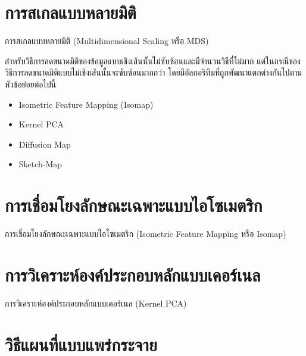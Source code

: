 \section{การสเกลแบบหลายมิติ}
\label{sec:mds}

การสเกลแบบหลายมิติ (Multidimensional Scaling หรือ MDS)\autocite{young1938,torgerson1952}

สำหรับวิธีการลดขนาดมิติของข้อมูลแบบเชิงเส้นนั้นไม่ซับซ้อนและมีจำนวนวิธีที่ไม่มาก แต่ในกรณีของวิธีการลดขนาดมิติแบบไม่เชิงเส้นนั้นจะซับซ้อนมากกว่า
โดยมีอัลกอริทึมที่ถูกพัฒนาแตกต่างกันไปตามหัวข้อย่อยต่อไปนี้\autocite{glielmo2021}

\begin{itemize}
    \item Isometric Feature Mapping (Isomap)
    
    \item Kernel PCA
    
    \item Diffusion Map
    
    \item Sketch-Map
\end{itemize}

\section{การเชื่อมโยงลักษณะเฉพาะแบบไอโซเมตริก}
\label{sec:isomap}

การเชื่อมโยงลักษณะเฉพาะแบบไอโซเมตริก (Isometric Feature Mapping หรือ Isomap)

\section{การวิเคราะห์องค์ประกอบหลักแบบเคอร์เนล}
\label{sec:kernel_pca}

การวิเคราะห์องค์ประกอบหลักแบบเคอร์เนล (Kernel PCA)

\section{วิธีแผนที่แบบแพร่กระจาย}
\label{sec:diff_map}

